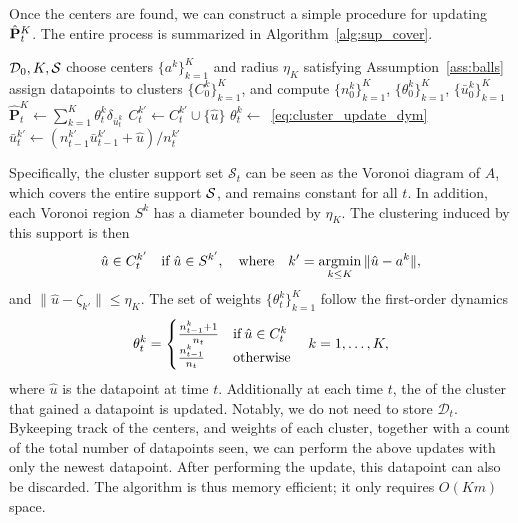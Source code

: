 Once the centers are found, we can construct a simple procedure for updating~$\hat{{\mathbf P}}^K_t$.  The entire process is summarized in Algorithm~\ref{alg:sup_cover}.
\begin{algorithm}[ht]
	\caption{SupCover}
	\label{alg:sup_cover}
	\begin{algorithmic}[1]
	  $\mathcal{D}_0, K,\mathcal{S}$
     \State choose centers $\{a^k\}_{k=1}^K$ and radius $\eta_K$ satisfying Assumption~\ref{ass:balls}
      \State assign datapoints to clusters $\{C^k_0\}_{k=1}^K$, and compute $\{n^k_0\}_{k=1}^K$, $\{\theta^k_0\}_{k=1}^K$, $\{\bar{u}_0^k\}_{k=1}^K$
     \State  $\hat{\mathbf{P}}^K_t \gets \sum_{k=1}^{K}\theta_t^k\delta_{\bar{u}_t^k}$
 \State $C_t^{k'} \gets C_t^{k'} \cup \{\hat{u}\}$ 
 \State $\theta^k_t\gets$~\eqref{eq:cluster_update_dym} 
     \State $\bar{u}^{k'}_t \gets (n^{k'}_{t-1}\bar{u}^{k'}_{t-1} + \hat{u})/n^{k'}_t$ 
  \EndFor
	\end{algorithmic}
\end{algorithm} 

Specifically, the cluster support set $\mathcal{S}_t$ can be seen as the Voronoi diagram of $A$, which covers the entire support $\mathcal{S}$, and remains constant for all $t$. In addition, each Voronoi region $S^k$ has a diameter bounded by $\eta_K$. The clustering induced by this support is then
\begin{equation}
\label{eq:assign_ball}
    \hat{u} \in C_t^{k'} \quad \text{if}\;  \hat{u} \in S^{k'}, \quad\text{where}\quad k'=\mathop{\rm argmin}_{k\leq K} \|\hat{u} - a^k\|,
\end{equation}
and $\|\hat{u} - \zeta_{k'}\| \leq \eta_K$.
The  set of weights $\{\theta^k_t\}_{k=1}^K$ follow the first-order dynamics
\begin{equation}
\label{eq:cluster_update_dym}
\theta^k_{t} = \begin{cases}
\frac{n^k_{t-1} + 1}{n_{t}} & \text{if} \:\hat{u} \in C^k_{t}\\
\frac{n^k_{t-1}}{n_{t}} & \text{otherwise}
\end{cases}\quad k=1,\dots, K,
\end{equation}
where $\hat{u}$ is the datapoint at time $t$. Additionally at each time $t$, the  of the cluster that gained a datapoint is updated.
Notably, we do not need to store $\mathcal{D}_t$. Bykeeping track of the centers,  and weights of each cluster, together with a count of the total number of datapoints seen, we can perform the above updates with only the newest datapoint. After performing the update, this datapoint can also be discarded. The algorithm is thus memory efficient; it only requires $O(Km)$ space. 

